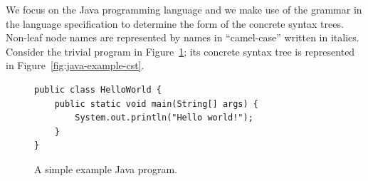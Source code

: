 We focus on the Java programming language and we make use of the grammar in the language specification \cite[][Chapter 18]{2012:book:gosling} to determine the form of the concrete syntax trees.  Non-leaf node names are represented by names in ``camel-case'' written in italics.  Consider the trivial program in Figure~\ref{fig:java-example}; its concrete syntax tree is represented in Figure~\ref{fig:java-example-cst}.

\begin{figure}
\begin{lstlisting}
public class HelloWorld {
    public static void main(String[] args) {
        System.out.println("Hello world!");
    }
}
\end{lstlisting}
\caption{A simple example Java program.\label{fig:java-example}}
\end{figure}

